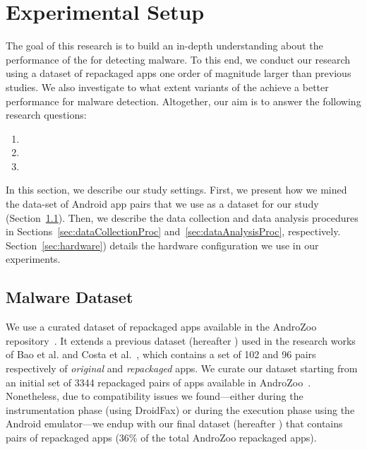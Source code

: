 \section{Experimental Setup}\label{sec:experimentalSetup}

The goal of this research is to build an in-depth understanding about
the performance of the \mas for detecting malware. To this
end, we conduct our research using a dataset of repackaged apps one order of magnitude
larger than previous studies. We also investigate to what
extent variants of the \mas achieve a better performance
for malware detection. Altogether, our
aim is to answer the following research questions:

\begin{enumerate}[(RQ1)]
\item \rqa
\item \rqb
\item \rqc  
\end{enumerate}

In this section, we describe our study settings. First, we present how we mined the data-set of Android app pairs that we
use as a dataset for our study (Section~\ref{sec:dataset}).  Then, we describe the data collection and
data analysis procedures in Sections~\ref{sec:dataCollectionProc} and~\ref{sec:dataAnalysisProc},
respectively. Section~\ref{sec:hardware}) details the hardware configuration we use in our
experiments.


\subsection{Malware Dataset}\label{sec:dataset}

We use a curated dataset of \apps repackaged apps available in the AndroZoo repository~\cite{DBLP:conf/msr/AllixBKT16}.
It extends a previous dataset (hereafter \sds) used in the research works of Bao et al. and Costa et al.~\cite{DBLP:conf/wcre/BaoLL18,DBLP:conf/scam/CostaMCMVBC20},
which contains a set of 102 and 96 pairs respectively of \emph{original} and \emph{repackaged} apps.
We curate our dataset starting from an initial set of 3344 repackaged pairs of apps available in AndroZoo~\cite{DBLP:conf/msr/AllixBKT16}.
Nonetheless, due to compatibility issues we found---either during the instrumentation phase (using DroidFax) or during the execution
phase using the Android emulator---we endup with our final dataset (hereafter \cds) that contains \apps pairs of
repackaged apps (36\% of the total AndroZoo repackaged apps). 

